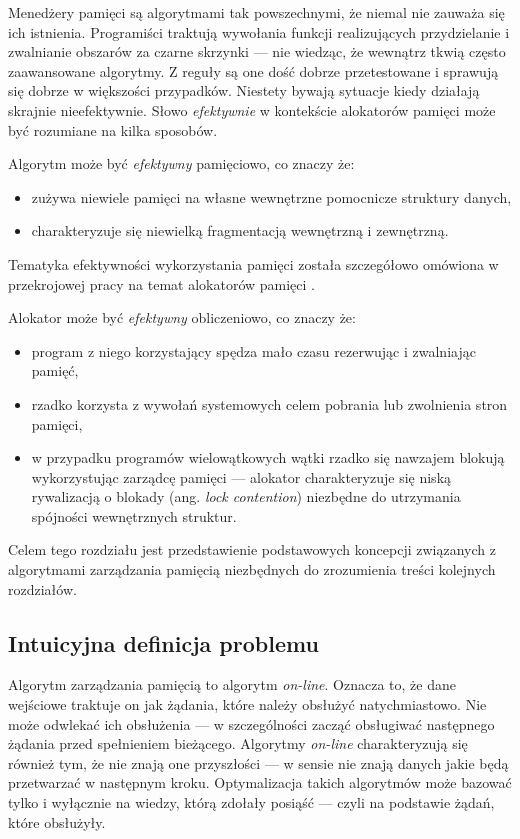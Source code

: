 \documentclass[12pt,a4paper,titlepage,twoside]{mwart}
\begin{document}
Menedżery pamięci są algorytmami tak powszechnymi, że niemal nie zauważa się ich
istnienia. Programiści traktują wywołania funkcji realizujących przydzielanie i
zwalnianie obszarów za czarne skrzynki --- nie wiedząc, że wewnątrz tkwią często
zaawansowane algorytmy. Z reguły są one dość dobrze przetestowane i sprawują
się dobrze w większości przypadków. Niestety bywają sytuacje kiedy działają
skrajnie nieefektywnie.  Słowo \textit{efektywnie} w kontekście alokatorów
pamięci może być rozumiane na kilka sposobów.

Algorytm może być \textit{efektywny} pamięciowo, co znaczy że:
\begin{itemize}
\item zużywa niewiele pamięci na własne wewnętrzne pomocnicze struktury danych,
\item charakteryzuje się niewielką fragmentacją wewnętrzną i zewnętrzną.
\end{itemize}
Tematyka efektywności wykorzystania pamięci została szczegółowo omówiona w
przekrojowej pracy na temat alokatorów pamięci \cite{paul95dynamic}.

Alokator może być \textit{efektywny} obliczeniowo, co znaczy że:
\begin{itemize}
\item program z niego korzystający spędza mało czasu rezerwując i zwalniając
pamięć,
\item rzadko korzysta z wywołań systemowych celem pobrania lub zwolnienia stron
pamięci,
\item w przypadku programów wielowątkowych wątki rzadko się nawzajem blokują
wykorzystując zarządcę pamięci --- alokator charakteryzuje się niską
rywalizacją o blokady (ang. \textit{lock contention}) niezbędne do utrzymania
spójności wewnętrznych struktur.
\end{itemize}

Celem tego rozdziału jest przedstawienie podstawowych koncepcji związanych z
algorytmami zarządzania pamięcią niezbędnych do zrozumienia treści kolejnych
rozdziałów. 

\subsection{Intuicyjna definicja problemu}

Algorytm zarządzania pamięcią to algorytm \textit{on-line}. Oznacza to, że dane
wejściowe traktuje on jak żądania, które należy obsłużyć natychmiastowo. Nie
może odwlekać ich obsłużenia --- w szczególności zacząć obsługiwać następnego
żądania przed spełnieniem bieżącego. Algorytmy \textit{on-line} charakteryzują
się również tym, że nie znają one przyszłości --- w sensie nie znają danych
jakie będą przetwarzać w następnym kroku. Optymalizacja takich algorytmów może
bazować tylko i wyłącznie na wiedzy, którą zdołały posiąść --- czyli na
podstawie żądań, które obsłużyły.
\end{document}
